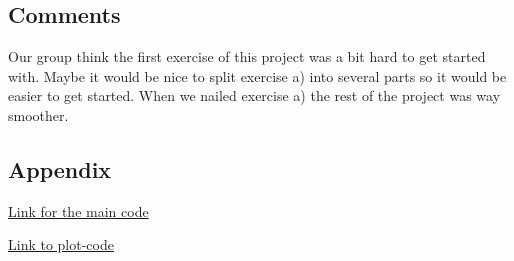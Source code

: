 \documentclass{article}
\begin{document}
\subsection*{Comments}
Our group think the first exercise of this project was a bit hard to get started with. Maybe it would be nice to split exercise a) into several parts so it would be easier to get started. When we nailed exercise a) the rest of the project was way smoother.

\subsection*{Appendix}


\href{{https://github.com/emmernme/MENA-Compfys/blob/master/Project%201/QT/main.cpp}}{Link for the main code}


\href{https://github.com/emmernme/MENA-Compfys/blob/master/Project%201/QT/plot.py}{Link to plot-code}
\end{document}
